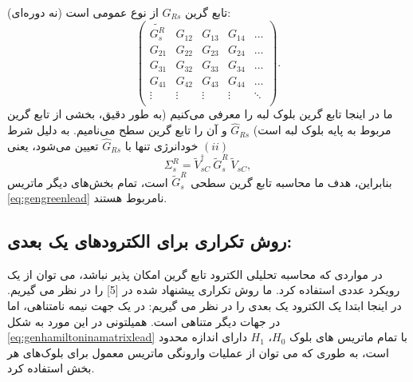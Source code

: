 تابع گرین $G_{Rs}$ از نوع عمومی است (نه دوره‌ای):
\begin{equation}
    \left( \begin{matrix}
           \widetilde{G_{s}^{R}} & {{G}_{12}} & {{G}_{13}} & {{G}_{14}} & \ldots   \\
           {{G}_{21}} & {{G}_{22}} & {{G}_{23}} & {{G}_{24}} & \ldots   \\
           {{G}_{31}} & {{G}_{32}} & {{G}_{33}} & {{G}_{34}} & \ldots   \\
           {{G}_{41}} & {{G}_{42}} & {{G}_{43}} & {{G}_{44}} & \ldots   \\
           \vdots  & \vdots  & \vdots  & \vdots  & \ddots   \\
        \end{matrix} \right).
        \label{eq:gengreenlead}
\end{equation}
ما در اینجا تابع گرین بلوک لبه را معرفی می‌کنیم (به طور دقیق، بخشی از تابع گرین مربوط به پایه بلوک لبه است) $\hat{G}_{Rs}$ و آن را تابع گرین سطح می‌نامیم. به دلیل شرط $(ii)$ خودانرژی تنها با $\hat{G}_{Rs}$ تعیین می‌شود، یعنی
\begin{equation}
    \Sigma _{s}^{R}=\tilde{V}_{sC}^{\dagger }\ \tilde{G}_{s}^{R}\ {{\tilde{V}}_{sC}},
\end{equation}
بنابراین، هدف ما محاسبه تابع گرین سطحی $\tilde{G}^R_s$ است، تمام بخش‌های دیگر ماتریس \ref{eq:gengreenlead} نامربوط هستند. 

\subsection{روش تکراری برای الکترودهای یک بعدی:}
در مواردی که محاسبه تحلیلی الکترود تابع گرین امکان پذیر نباشد، می توان از یک رویکرد عددی استفاده کرد. ما روش تکراری پیشنهاد شده در [5] را در نظر می گیریم. در اینجا ابتدا یک الکترود یک بعدی را در نظر می گیریم: در یک جهت نیمه نامتناهی، اما در جهات دیگر متناهی است. همیلتونی در این مورد به شکل \ref{eq:genhamiltoninamatrixlead} با تمام ماتریس های بلوک $H_0$، $H_1$ دارای اندازه محدود است، به طوری که می توان از عملیات وارونگی ماتریس معمول برای بلوک‌های هر بخش استفاده کرد.

